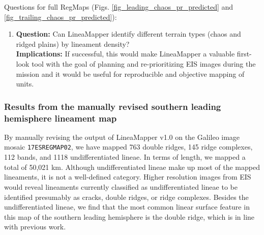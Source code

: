 Questions for full RegMaps (Figs. \ref{fig_leading_chaos_pr_predicted} and \ref{fig_trailing_chaos_pr_predicted}):
\begin{enumerate}
    \item \textbf{Question:} Can LineaMapper identify different terrain types (chaos and ridged plains) by lineament density?\\
    \textbf{Implications:} If successful, this would make LineaMapper a valuable first-look tool with the goal of planning and re-prioritizing EIS images during the mission and it would be useful for reproducible and objective mapping of units.
\end{enumerate}


\subsubsection{Results from the manually revised southern leading hemisphere lineament map}
By manually revising the output of LineaMapper v1.0 on the Galileo image mosaic \texttt{17ESREGMAP02}, we have mapped 763 double ridges, 145 ridge complexes, 112 bands, and 1118 undifferentiated lineae. In terms of length, we mapped a total of 50,021 km. Although undifferentiated lineae make up most of the mapped lineaments, it is not a well-defined category. Higher resolution images from EIS would reveal lineaments currently classified as undifferentiated lineae to be identified presumably as cracks, double ridges, or ridge complexes. Besides the undifferentiated lineae, we find that the most common linear surface feature in this map of the southern leading hemisphere is the double ridge, which is in line with previous work. 


